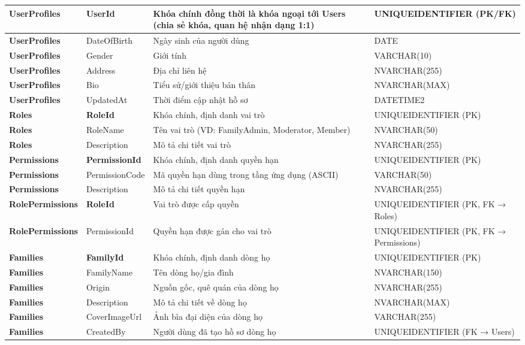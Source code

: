 \begin{longtable}{|p{}|p{}|p{}|p{}|}
\textbf{UserProfiles} & \textbf{UserId} & Khóa chính đồng thời là khóa ngoại tới Users (chia sẻ khóa, quan hệ nhận dạng 1:1) & UNIQUEIDENTIFIER (PK/FK) \\ \hline
\textbf{UserProfiles} & DateOfBirth & Ngày sinh của người dùng & DATE \\ \hline
\textbf{UserProfiles} & Gender & Giới tính & VARCHAR(10) \\ \hline
\textbf{UserProfiles} & Address & Địa chỉ liên hệ & NVARCHAR(255) \\ \hline
\textbf{UserProfiles} & Bio & Tiểu sử/giới thiệu bản thân & NVARCHAR(MAX) \\ \hline
\textbf{UserProfiles} & UpdatedAt & Thời điểm cập nhật hồ sơ & DATETIME2 \\ \hline
\textbf{Roles} & \textbf{RoleId} & Khóa chính, định danh vai trò & UNIQUEIDENTIFIER (PK) \\ \hline
\textbf{Roles} & RoleName & Tên vai trò (VD: FamilyAdmin, Moderator, Member) & NVARCHAR(50) \\ \hline
\textbf{Roles} & Description & Mô tả chi tiết vai trò & NVARCHAR(255) \\ \hline
\textbf{Permissions} & \textbf{PermissionId} & Khóa chính, định danh quyền hạn & UNIQUEIDENTIFIER (PK) \\ \hline
\textbf{Permissions} & PermissionCode & Mã quyền hạn dùng trong tầng ứng dụng (ASCII) & VARCHAR(50) \\ \hline
\textbf{Permissions} & Description & Mô tả chi tiết quyền hạn & NVARCHAR(255) \\ \hline
\textbf{RolePermissions} & \textbf{RoleId} & Vai trò được cấp quyền & UNIQUEIDENTIFIER (PK, FK → Roles) \\ \hline
\textbf{RolePermissions} & PermissionId & Quyền hạn được gán cho vai trò & UNIQUEIDENTIFIER (PK, FK → Permissions) \\ \hline
\textbf{Families} & \textbf{FamilyId} & Khóa chính, định danh dòng họ & UNIQUEIDENTIFIER (PK) \\ \hline
\textbf{Families} & FamilyName & Tên dòng họ/gia đình & NVARCHAR(150) \\ \hline
\textbf{Families} & Origin & Nguồn gốc, quê quán của dòng họ & NVARCHAR(255) \\ \hline
\textbf{Families} & Description & Mô tả chi tiết về dòng họ & NVARCHAR(MAX) \\ \hline
\textbf{Families} & CoverImageUrl & Ảnh bìa đại diện của dòng họ & VARCHAR(255) \\ \hline
\textbf{Families} & CreatedBy & Người dùng đã tạo hồ sơ dòng họ & UNIQUEIDENTIFIER (FK → Users) \\ \hline

\end{longtable}
